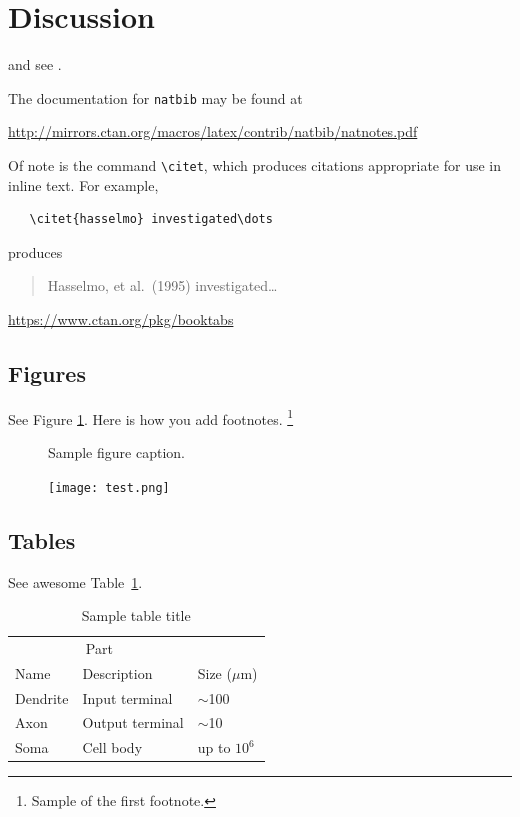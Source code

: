 \documentclass{article}
\begin{document}
\section{Discussion}


\label{sec:others}
\lipsum[8] \cite{kour2014real,kour2014fast} and see \cite{hadash2018estimate}.

The documentation for \verb+natbib+ may be found at
\begin{center}
  \url{http://mirrors.ctan.org/macros/latex/contrib/natbib/natnotes.pdf}
\end{center}
Of note is the command \verb+\citet+, which produces citations
appropriate for use in inline text.  For example,
\begin{verbatim}
   \citet{hasselmo} investigated\dots
\end{verbatim}
produces
\begin{quote}
  Hasselmo, et al.\ (1995) investigated\dots
\end{quote}

\begin{center}
  \url{https://www.ctan.org/pkg/booktabs}
\end{center}


\subsection{Figures}
\lipsum[10] 
See Figure \ref{fig:fig1}. Here is how you add footnotes. \footnote{Sample of the first footnote.}
\lipsum[11] 

\begin{figure}
  \centering
  \fbox{\rule[-.5cm]{4cm}{4cm} \rule[-.5cm]{4cm}{0cm}}
  \caption{Sample figure caption.}
  \label{fig:fig1}
\end{figure}

\begin{figure} %
    \centering
    \texttt{[image: test.png]}
\end{figure}

\subsection{Tables}
\lipsum[12]
See awesome Table~\ref{tab:table}.

\begin{table}
 \caption{Sample table title}
  \centering
  \begin{tabular}{lll}
    \toprule
    \multicolumn{2}{c}{Part}                   \\
    \cmidrule(r){1-2}
    Name     & Description     & Size ($\mu$m) \\
    \midrule
    Dendrite & Input terminal  & $\sim$100     \\
    Axon     & Output terminal & $\sim$10      \\
    Soma     & Cell body       & up to $10^6$  \\
    \bottomrule
  \end{tabular}
  \label{tab:table}
\end{table}
\end{document}
